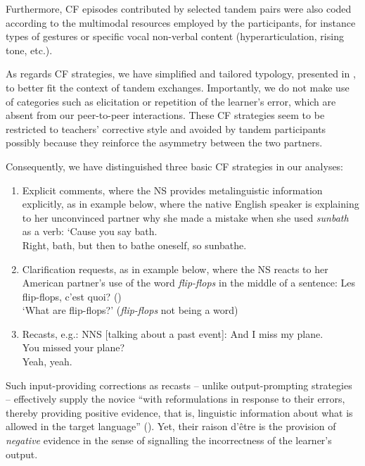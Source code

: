 \documentclass[output=paper,colorlinks,citecolor=brown,modfonts,nonflat]{../langscibook}
\begin{document}
Furthermore, CF episodes contributed by selected tandem pairs were also coded according to the multimodal resources employed by the participants, for instance types of gestures or specific vocal non-verbal content (hyperarticulation, rising tone, etc.). 

As regards CF strategies, we have simplified and tailored  typology, presented in , to better fit the context of tandem exchanges. Importantly, we do not make use of categories such as elicitation or repetition of the learner’s error, which are absent from our peer-to-peer interactions. These CF strategies seem to be restricted to teachers’ corrective style and avoided by tandem participants possibly because they reinforce the asymmetry between the two partners. 

Consequently, we have distinguished three basic CF strategies in our analyses: 

\begin{enumerate}
\item Explicit comments, where the NS provides metalinguistic information explicitly, as in example  below, where the native English speaker is explaining to her unconvinced  partner why she made a mistake when she used \textit{sunbath} as a verb:
\ea\label{ex:scheuer:3}
{\NNS} {‘Cause} {you} {say} {bath.}\\
{\NS} {Right,} {bath,} {but} {then} {to} {bathe} {oneself,} {so} {sunbathe}.
\z

\item Clarification requests, as in example  below, where the NS reacts to her American partner’s use of the word \textit{flip-flops} in the middle of a  sentence:
\ea\label{ex:scheuer:4}
{\NS} {Les} {flip-flops,} {c’est} {quoi?}  ()\\
{\TRS}‘What are flip-flops?’ (\textit{flip-flops} not being a  word)
\z

\item Recasts, e.g.:
\ea \label{ex:scheuer:5}
NNS [talking about a past event]:  {And}  {I}  {miss}  {my}  {plane}.\\
{\NS} {You} {missed} {your} {plane?}\\
{\NNS} {Yeah,} {yeah.}
\z
\end{enumerate}

Such input-providing corrections as recasts – unlike output-prompting strategies – effectively supply the novice “with reformulations in response to their errors, thereby providing positive evidence, that is, linguistic information about what is allowed in the target language” (\citealt[32]{SatoLoewen2019}). Yet, their raison d’être is the provision of \textit{negative} evidence in the sense of signalling the incorrectness of the learner’s output.
\end{document}
